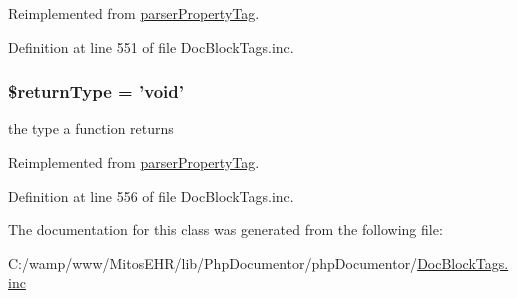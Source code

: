 \-Reimplemented from \hyperlink{classparser_property_tag_a4a925d6b38bcf3957c713a7d3dc7da1f}{parser\-Property\-Tag}.



\-Definition at line 551 of file \-Doc\-Block\-Tags.\-inc.

\hypertarget{classparser_method_tag_a0f317c2c1d4c617554890223a39037be}{
\subsubsection[{\$return\-Type}]{\setlength{\rightskip}{0pt plus 5cm}\$return\-Type = 'void'}}\label{classparser_method_tag_a0f317c2c1d4c617554890223a39037be}
the type a function returns 

\-Reimplemented from \hyperlink{classparser_property_tag_a0f317c2c1d4c617554890223a39037be}{parser\-Property\-Tag}.



\-Definition at line 556 of file \-Doc\-Block\-Tags.\-inc.



\-The documentation for this class was generated from the following file\-:\begin{DoxyCompactItemize}
\item 
\-C\-:/wamp/www/\-Mitos\-E\-H\-R/lib/\-Php\-Documentor/php\-Documentor/\hyperlink{_doc_block_tags_8inc}{\-Doc\-Block\-Tags.\-inc}\end{DoxyCompactItemize}
